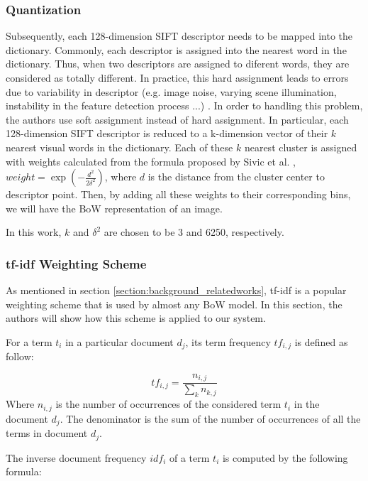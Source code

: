 \subsubsection{Quantization} \label{section:quantization}

Subsequently, each 128-dimension SIFT descriptor needs to be mapped into the dictionary. Commonly, each descriptor is assigned into the nearest word in the dictionary. Thus, when two descriptors are assigned to diferent words, they are considered as totally different. In practice, this hard assignment leads to errors due to variability in descriptor (e.g. image noise, varying scene illumination, instability in the feature detection process ...) \cite{7}. In order to handling this problem, the authors use soft assignment instead of hard assignment. In particular, each 128-dimension SIFT descriptor is reduced to a k-dimension vector of their $k$ nearest visual words in the dictionary. Each of these $k$ nearest cluster is assigned with weights calculated from the formula proposed by Sivic et al. \cite{7}, $weight = \exp(-\frac{d^2}{2\delta^2})$, where $d$ is the distance from the cluster center to descriptor point. Then, by adding all these weights to their corresponding bins, we will have the BoW representation of an image.

In this work, $k$ and $\delta^2$ are chosen to be 3 and 6250, respectively.

\subsubsection{tf-idf Weighting Scheme} \label{section:tfidf_weighting}

As mentioned in section \ref{section:background_relatedworks}, tf-idf is a popular weighting scheme that is used by almost any BoW model. In this section, the authors will show how this scheme is applied to our system.

For a term $t_{i}$ in a particular document $d_{j}$, its term frequency $tf_{i, j}$ is defined as follow:

\begin{equation} 
        tf_{i, j} = \frac{n_{i, j}}{\sum\limits_{k} n_{k, j}}
\end{equation}
Where $n_{i, j}$ is the number of occurrences of the considered term $t_{i}$ in the document $d_{j}$. The denominator is the sum of the number of occurrences of all the terms in document $d_{j}$.

The inverse document frequency $idf_{i}$ of a term $t_{i}$ is computed by the following formula:

